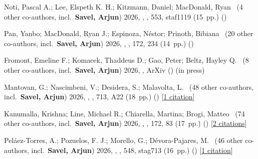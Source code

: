 \item[{\color{numcolor}\scriptsize52}] Noti, Pascal A.; Lee, Elspeth K. H.; Kitzmann, Daniel; MacDonald, Ryan \etal{}\ ({4} other co-authors, incl.\ \textbf{Savel, Arjun}) 2026, , \mnras, {553}, staf1119 (15~pp.) ()

\item[{\color{numcolor}\scriptsize51}] Pan, Yanbo; MacDonald, Ryan J.; Espinoza, N{\'e}stor; Prinoth, Bibiana \etal{}\ ({20} other co-authors, incl.\ \textbf{Savel, Arjun}) 2026, , \aj, {172}, 234 (14~pp.) ()

\item[{\color{numcolor}\scriptsize50}] Fromont, Emeline F.; Komacek, Thaddeus D.; Gao, Peter; Beltz, Hayley Q. \etal{}\ ({8} other co-authors, incl.\ \textbf{Savel, Arjun}) 2026, , ArXiv () (in press)

\item[{\color{numcolor}\scriptsize49}] Mantovan, G.; Nascimbeni, V.; Desidera, S.; Malavolta, L. \etal{}\ ({48} other co-authors, incl.\ \textbf{Savel, Arjun}) 2026, , \aanda, {713}, A22 (18~pp.) () [\href{https://ui.adsabs.harvard.edu/abs/2026A&A...713A..22M}{1 citation}]

\item[{\color{numcolor}\scriptsize48}] Kanumalla, Krishna; Line, Michael R.; Chiarella, Martina; Brogi, Matteo \etal{}\ ({74} other co-authors, incl.\ \textbf{Savel, Arjun}) 2026, , \aj, {172}, 83 (17~pp.) () [\href{https://ui.adsabs.harvard.edu/abs/2026AJ....172...83K}{2 citations}]

\item[{\color{numcolor}\scriptsize47}] Pel{\'a}ez-Torres, A.; Pozuelos, F. J.; Morello, G.; D{\'e}vora-Pajares, M. \etal{}\ ({46} other co-authors, incl.\ \textbf{Savel, Arjun}) 2026, , \mnras, {548}, stag713 (16~pp.) () [\href{https://ui.adsabs.harvard.edu/abs/2026MNRAS.548ag713P}{1 citation}]

